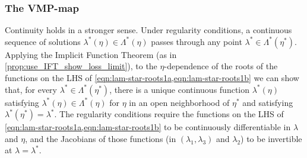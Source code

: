 \subsubsection{The VMP-map}
Continuity holds in a stronger sense. Under regularity conditions, a continuous sequence of solutions $\lambda^*(\eta)\in \Lambda^*(\eta)$ passes through any point $\lambda^*\in \Lambda^*(\eta^*)$.
Applying the Implicit Function Theorem (as in \cref{prop:use_IFT_show_loss_limit}), to the $\eta$-dependence of the roots of the functions on the LHS of \cref{eqn:lam-star-roots1a,eqn:lam-star-roots1b} we can show that, for every $\lambda^*\in\Lambda^*(\eta^*)$, there is a unique continuous function $\lambda^*(\eta)$ satisfying $\lambda^*(\eta)\in\Lambda^*(\eta)$ for $\eta$ in an open neighborhood of $\eta^*$ and satisfying $\lambda^*(\eta^*)=\lambda^*$. The regularity conditions require the functions on the LHS of \cref{eqn:lam-star-roots1a,eqn:lam-star-roots1b} to be continuously differentiable in $\lambda$ and $\eta$, and the Jacobians of those functions (in $(\lambda_1,\lambda_3)$ and $\lambda_2$) to be invertible at $\lambda=\lambda^*$.


